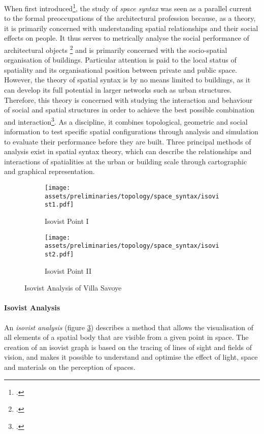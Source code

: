 \documentclass[a4paper, 12pt]{report}
\begin{document}
When first introduced\footcite{hillier1989social}, the study of \textit{space syntax} was seen as a parallel current to the formal preoccupations of the architectural profession because, as a theory, it is primarily concerned with understanding spatial relationships and their social effects on people. It thus serves to metrically analyse the social performance of architectural objects \footcite{nourian2013designing} and is primarily concerned with the socio-spatial organisation of buildings. Particular attention is paid to the local status of spatiality and its organisational position between private and public space. However, the theory of spatial syntax is by no means limited to buildings, as it can develop its full potential in larger networks such as urban structures. Therefore, this theory is concerned with studying the interaction and behaviour of social and spatial structures in order to achieve the best possible combination and interaction\footcite{franz2005graph}. As a discipline, it combines topological, geometric and social information to test specific spatial configurations through analysis and simulation to evaluate their performance before they are built. Three principal methods of analysis exist in spatial syntax theory, which can describe the relationships and interactions of spatialities at the urban or building scale through cartographic and graphical representation.

\begin{figure}
\centering
\begin{subfigure}{.5\textwidth}
\centering
\texttt{[image: assets/preliminaries/topology/space\_syntax/isovist1.pdf]}
\caption{Isovist Point I}
\label{fig:isovist-point-i}
\end{subfigure}%
\begin{subfigure}{.5\textwidth}
\centering
\texttt{[image: assets/preliminaries/topology/space\_syntax/isovist2.pdf]}
\caption{Isovist Point II}
\label{fig:isovist-point-ii}
\end{subfigure}
\caption{Isovist Analysis of Villa Savoye}
\label{fig:isovist-analysis-of-villa-savoye}
\end{figure}

\paragraph{Isovist Analysis}\label{par:isovist-analysis}

An\textit{ \gls{isovist} analysis} (figure \ref{fig:isovist-analysis-of-villa-savoye}) describes a method that allows the visualisation of all elements of a spatial body that are visible from a given point in space. The creation of an \gls{isovist} graph is based on the tracing of lines of sight and fields of vision, and makes it possible to understand and optimise the effect of light, space and materials on the perception of spaces.
\end{document}
